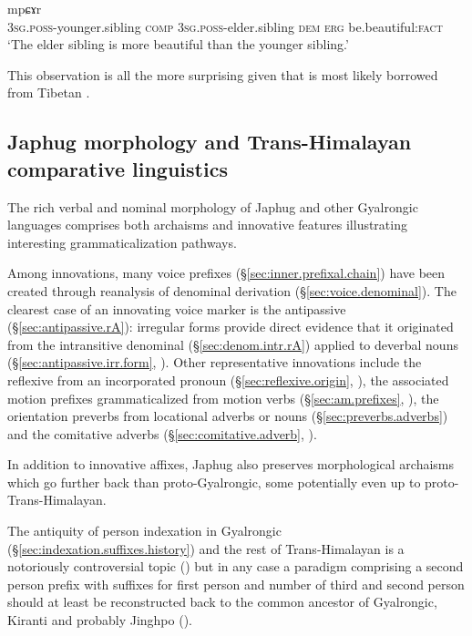 \begin{exe}
\ex \label{ex:sAz.mpCAr}
\gll  [ɯ-ʁi sɤz] [ɯ-pi nɯ kɯ] mpɕɤr  \\
\textsc{3sg}.\textsc{poss}-younger.sibling \textsc{comp} \textsc{3sg}.\textsc{poss}-elder.sibling \textsc{dem} \textsc{erg} be.beautiful:\textsc{fact} \\
\glt `The elder sibling is more beautiful than the younger sibling.' 
\end{exe}

This observation is all the more surprising given that  is most likely borrowed from Tibetan \citep{jacques16comparative}.

\subsection{Japhug morphology and Trans-Himalayan comparative linguistics} \label{sec:comparative.morphology.intro}
The rich verbal and nominal morphology of Japhug and other Gyalrongic languages comprises both archaisms  and innovative features illustrating interesting grammaticalization pathways.

Among innovations, many voice prefixes (§\ref{sec:inner.prefixal.chain}) have been created through reanalysis of denominal derivation (§\ref{sec:voice.denominal}). The clearest case of an innovating voice marker is the antipassive  (§\ref{sec:antipassive.rA}): irregular forms provide direct evidence  that it originated from the intransitive denominal   (§\ref{sec:denom.intr.rA}) applied to deverbal nouns (§\ref{sec:antipassive.irr.form},  \citealt{jacques14antipassive}). Other representative innovations include the reflexive  from an incorporated pronoun (§\ref{sec:reflexive.origin}, \citealt{jacques10refl}), the associated motion prefixes grammaticalized from motion verbs (§\ref{sec:am.prefixes}, \citealt{jacques13harmonization}), the orientation preverbs from locational adverbs or nouns (§\ref{sec:preverbs.adverbs}) and the comitative adverbs (§\ref{sec:comitative.adverb}, \citealt{jacques17comitative}).

In addition to innovative affixes, Japhug also preserves morphological archaisms which go further back than proto-Gyalrongic, some potentially even up to proto-Trans-Himalayan.

The antiquity of person indexation in Gyalrongic (§\ref{sec:indexation.suffixes.history}) and the rest of Trans-Himalayan is a notoriously controversial topic (\citealt{bauman75, delancey89agreement, lapolla92, driem93agreement}) but in any case a paradigm comprising a second person prefix with suffixes for first person and number of third and second person should at least be reconstructed back to the common ancestor of Gyalrongic, Kiranti and probably Jinghpo (\citealt{jacques12agreement, delancey14second, jacques16th}).

